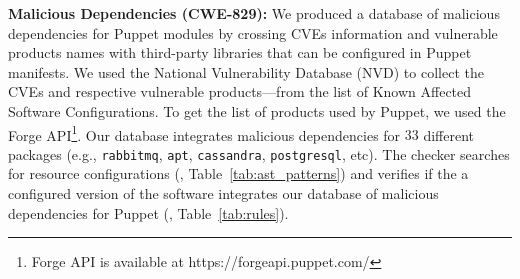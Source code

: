 \textbf{Malicious Dependencies (CWE-829):} We produced a database of 
malicious dependencies for 
Puppet modules by crossing CVEs information and 
vulnerable products names with third-party libraries 
that can be configured in Puppet manifests.
We used the National Vulnerability Database (NVD)
to collect the CVEs and respective vulnerable 
products---from the list of Known Affected Software Configurations.
To get the list of products used by Puppet,
we used the Forge API\footnote{Forge API is available 
at https://forgeapi.puppet.com/}. 
Our database integrates malicious dependencies
for $33$ different packages (e.g., \texttt{rabbitmq}, 
\texttt{apt}, \texttt{cassandra}, \texttt{postgresql}, etc).
The checker searches for resource configurations (, Table~\ref{tab:ast_patterns})
and verifies if the 
a configured version of the software integrates 
our database of malicious dependencies for Puppet (, Table~\ref{tab:rules}).



